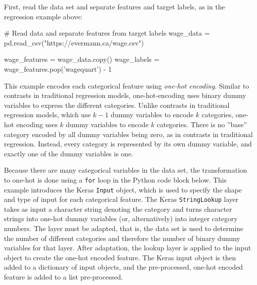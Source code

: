 First, read the data set and separate features and target labels, as in the regression example above:

\begin{samepage}
\begin{pythoncode}
# Read data and separate features from target labels
wage_data = pd.read_csv("https://evermann.ca/wage.csv")
    
wage_features = wage_data.copy()
wage_labels = wage_features.pop('wagequart') - 1
\end{pythoncode}
\end{samepage}

This example encodes each categorical feature using \emph{one-hot encoding}. Similar to contrasts in traditional regression models, one-hot-encoding uses binary dummy variables to express the different categories. Unlike contrasts in traditional regression models, which use $k-1$ dummy variables to encode $k$ categories, one-hot encoding uses $k$ dummy variables to encode $k$ categories. There is no ''base'' category encoded by all dummy variables being zero, as in contrasts in traditional regression. Instead, every category is represented by its own dummy variable, and exactly one of the dummy variables is one. 

Because there are many categorical variables in the data set, the transformation to one-hot is done using a \texttt{for} loop in the Python code block below. This example introduces the Keras \texttt{Input} object, which is used to specify the shape and type of input for each categorical feature. The Keras \texttt{StringLookup} layer takes as input a character string denoting the category and turns character strings into one-hot dummy variables (or, alternatively) into integer category numbers. The layer must be adapted, that is, the data set is used to determine the number of different categories and therefore the number of binary dummy variables for that layer. After adaptation, the lookup layer is applied to the input object to create the one-hot encoded feature. The Keras input object is then added to a dictionary of input objects, and the pre-processed, one-hot encoded feature is added to a list pre-processed.

